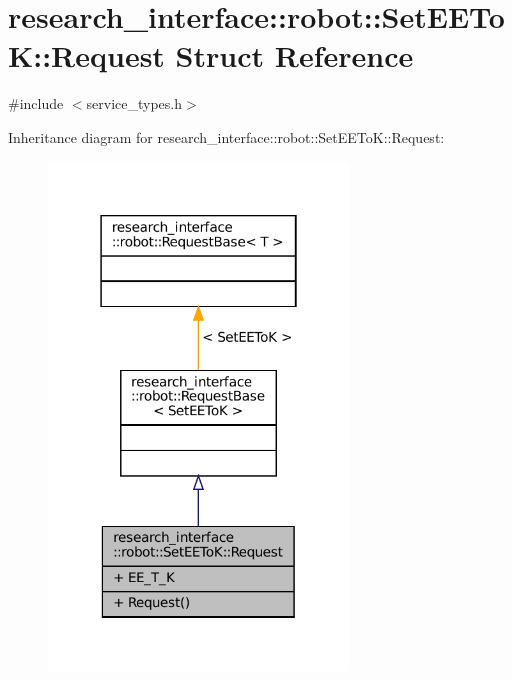 \hypertarget{structresearch__interface_1_1robot_1_1SetEEToK_1_1Request}{}\section{research\+\_\+interface\+:\+:robot\+:\+:Set\+E\+E\+ToK\+:\+:Request Struct Reference}
\label{structresearch__interface_1_1robot_1_1SetEEToK_1_1Request}


{\ttfamily \#include $<$service\+\_\+types.\+h$>$}



Inheritance diagram for research\+\_\+interface\+:\+:robot\+:\+:Set\+E\+E\+ToK\+:\+:Request\+:
\nopagebreak
\begin{figure}[H]
\begin{center}
\leavevmode
\includegraphics[width=226pt]{structresearch__interface_1_1robot_1_1SetEEToK_1_1Request__inherit__graph}
\end{center}
\end{figure}


